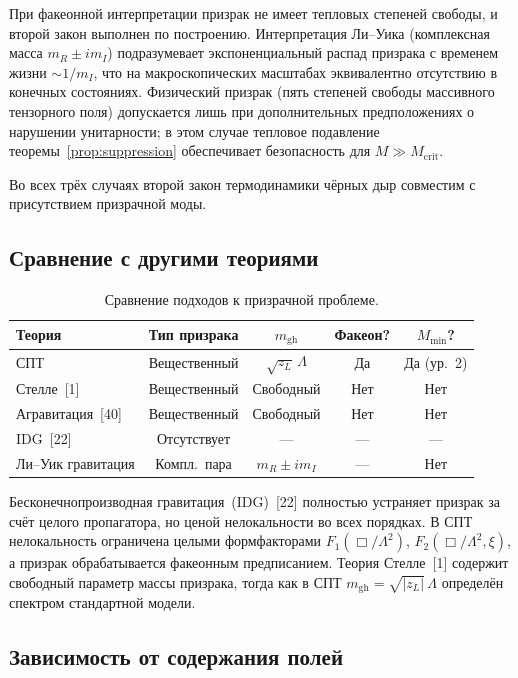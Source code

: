 \documentclass[12pt,a4paper]{article}
\newcommand{\Lam}{\Lambda}
\newcommand{\Mcrit}{M_{\mathrm{crit}}}
\newcommand{\mghost}{m_{\mathrm{gh}}}
\theoremstyle{plain}
\theoremstyle{definition}
\begin{document}
При факеонной интерпретации призрак не имеет тепловых степеней свободы,
и второй закон выполнен по построению. Интерпретация Ли--Уика
(комплексная масса $m_R \pm im_I$) подразумевает экспоненциальный
распад призрака с временем жизни $\sim 1/m_I$, что на макроскопических
масштабах эквивалентно отсутствию в конечных состояниях.
Физический призрак (пять степеней свободы массивного тензорного поля)
допускается лишь при дополнительных предположениях о нарушении
унитарности; в этом случае тепловое подавление теоремы~\ref{prop:suppression}
обеспечивает безопасность для $M \gg \Mcrit$.

Во всех трёх случаях второй закон термодинамики чёрных дыр совместим
с присутствием призрачной моды.

\subsection{Сравнение с другими теориями}

\begin{table}[ht]
\centering
\caption{Сравнение подходов к призрачной проблеме.}\label{tab:comparison}
\begin{tabular}{lcccc}
\toprule
Теория & Тип призрака & $\mghost$ & Факеон? & $M_{\min}$? \\
\midrule
СПТ & Вещественный & $\sqrt{z_L}\,\Lam$ & Да & Да (ур.~2) \\
Стелле~[1] & Вещественный & Свободный & Нет & Нет \\
Агравитация~[40] & Вещественный & Свободный & Нет & Нет \\
IDG~[22] & Отсутствует & --- & --- & --- \\
Ли--Уик гравитация & Компл.\ пара & $m_R \pm im_I$ & --- & Нет \\
\bottomrule
\end{tabular}
\end{table}

Бесконечнопроизводная гравитация~(IDG)~[22] полностью устраняет
призрак за счёт целого пропагатора, но ценой нелокальности во всех
порядках. В СПТ нелокальность ограничена целыми формфакторами
$F_1(\Box/\Lam^2)$, $F_2(\Box/\Lam^2,\xi)$, а призрак обрабатывается
факеонным предписанием. Теория Стелле~[1] содержит свободный
параметр массы призрака, тогда как в СПТ $\mghost = \sqrt{|z_L|}\,\Lam$
определён спектром стандартной модели.

\subsection{Зависимость от содержания полей}
\end{document}
